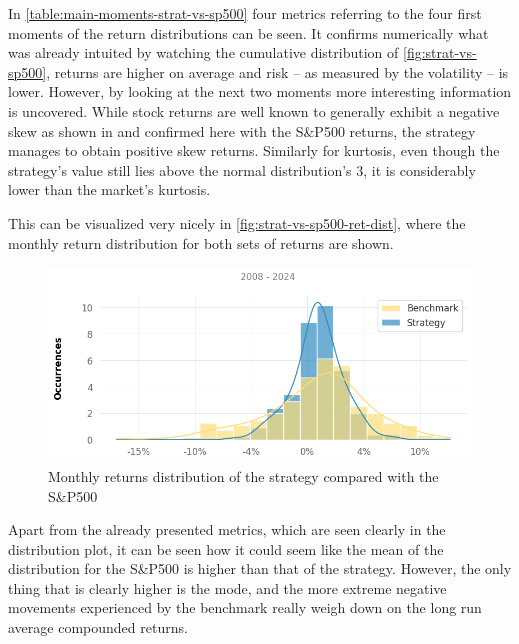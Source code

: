 In \autoref{table:main-moments-strat-vs-sp500} four metrics referring to the four first moments of the return distributions can be seen. 
It confirms numerically what was already intuited by watching the cumulative distribution of \autoref{fig:strat-vs-sp500}, returns are higher on average and risk -- as measured by the volatility -- is lower. However, by looking at the next two moments more interesting information is uncovered. While stock returns are well known to generally exhibit a negative skew as shown in \cite{peiro_1999} and confirmed here with the S\&P500 returns, the strategy manages to obtain positive skew returns. Similarly for kurtosis, even though the strategy's value still lies above the normal distribution's 3, it is considerably lower than the market's kurtosis.

This can be visualized very nicely in \autoref{fig:strat-vs-sp500-ret-dist}, where the monthly return distribution for both sets of returns are shown. 

\begin{figure}[ht]
    \includegraphics[width=\linewidth]{assets/strat-vs-sp500-ret-dist.png}
    \caption{Monthly returns distribution of the strategy compared with the S\&P500}
    \label{fig:strat-vs-sp500-ret-dist}
\end{figure}

Apart from the already presented metrics, which are seen clearly in the distribution plot, it can be seen how it could seem like the mean of the distribution for the S\&P500 is higher than that of the strategy. However, the only thing that is clearly higher is the mode, and the more extreme negative movements experienced by the benchmark really weigh down on the long run average compounded returns. 

